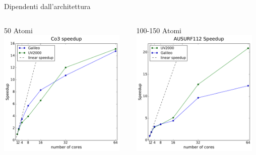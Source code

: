 \documentclass[8pt]{beamer}
\begin{document}
\begin{frame}{Dipendenti dall'architettura}


	\begin{columns}
	\begin{center}	
		50 Atomi\\
		\includegraphics[width=0.95\textwidth]{beam_concl_co3.pdf}			
	\end{center}

	
	\begin{center}	
		100-150 Atomi\\
		\includegraphics[width=0.95\textwidth]{concl_ausurf.pdf}			
	\end{center}	
			

\end{columns}
\end{frame}
\end{document}
